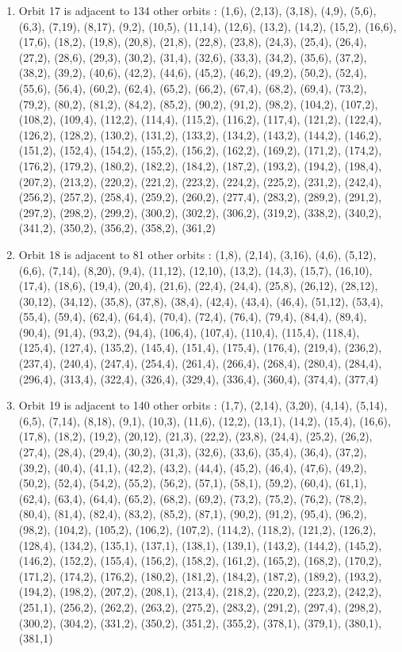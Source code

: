 \documentclass[12pt]{article}
\begin{document}
\begin{enumerate}
\item Orbit 17 is adjacent to 134 other orbits : (1,6), (2,13), (3,18), (4,9), (5,6), (6,3), (7,19), (8,17), (9,2), (10,5), (11,14), (12,6), (13,2), (14,2), (15,2), (16,6), (17,6), (18,2), (19,8), (20,8), (21,8), (22,8), (23,8), (24,3), (25,4), (26,4), (27,2), (28,6), (29,3), (30,2), (31,4), (32,6), (33,3), (34,2), (35,6), (37,2), (38,2), (39,2), (40,6), (42,2), (44,6), (45,2), (46,2), (49,2), (50,2), (52,4), (55,6), (56,4), (60,2), (62,4), (65,2), (66,2), (67,4), (68,2), (69,4), (73,2), (79,2), (80,2), (81,2), (84,2), (85,2), (90,2), (91,2), (98,2), (104,2), (107,2), (108,2), (109,4), (112,2), (114,4), (115,2), (116,2), (117,4), (121,2), (122,4), (126,2), (128,2), (130,2), (131,2), (133,2), (134,2), (143,2), (144,2), (146,2), (151,2), (152,4), (154,2), (155,2), (156,2), (162,2), (169,2), (171,2), (174,2), (176,2), (179,2), (180,2), (182,2), (184,2), (187,2), (193,2), (194,2), (198,4), (207,2), (213,2), (220,2), (221,2), (223,2), (224,2), (225,2), (231,2), (242,4), (256,2), (257,2), (258,4), (259,2), (260,2), (277,4), (283,2), (289,2), (291,2), (297,2), (298,2), (299,2), (300,2), (302,2), (306,2), (319,2), (338,2), (340,2), (341,2), (350,2), (356,2), (358,2), (361,2)
\item Orbit 18 is adjacent to 81 other orbits : (1,8), (2,14), (3,16), (4,6), (5,12), (6,6), (7,14), (8,20), (9,4), (11,12), (12,10), (13,2), (14,3), (15,7), (16,10), (17,4), (18,6), (19,4), (20,4), (21,6), (22,4), (24,4), (25,8), (26,12), (28,12), (30,12), (34,12), (35,8), (37,8), (38,4), (42,4), (43,4), (46,4), (51,12), (53,4), (55,4), (59,4), (62,4), (64,4), (70,4), (72,4), (76,4), (79,4), (84,4), (89,4), (90,4), (91,4), (93,2), (94,4), (106,4), (107,4), (110,4), (115,4), (118,4), (125,4), (127,4), (135,2), (145,4), (151,4), (175,4), (176,4), (219,4), (236,2), (237,4), (240,4), (247,4), (254,4), (261,4), (266,4), (268,4), (280,4), (284,4), (296,4), (313,4), (322,4), (326,4), (329,4), (336,4), (360,4), (374,4), (377,4)
\item Orbit 19 is adjacent to 140 other orbits : (1,7), (2,14), (3,20), (4,14), (5,14), (6,5), (7,14), (8,18), (9,1), (10,3), (11,6), (12,2), (13,1), (14,2), (15,4), (16,6), (17,8), (18,2), (19,2), (20,12), (21,3), (22,2), (23,8), (24,4), (25,2), (26,2), (27,4), (28,4), (29,4), (30,2), (31,3), (32,6), (33,6), (35,4), (36,4), (37,2), (39,2), (40,4), (41,1), (42,2), (43,2), (44,4), (45,2), (46,4), (47,6), (49,2), (50,2), (52,4), (54,2), (55,2), (56,2), (57,1), (58,1), (59,2), (60,4), (61,1), (62,4), (63,4), (64,4), (65,2), (68,2), (69,2), (73,2), (75,2), (76,2), (78,2), (80,4), (81,4), (82,4), (83,2), (85,2), (87,1), (90,2), (91,2), (95,4), (96,2), (98,2), (104,2), (105,2), (106,2), (107,2), (114,2), (118,2), (121,2), (126,2), (128,4), (134,2), (135,1), (137,1), (138,1), (139,1), (143,2), (144,2), (145,2), (146,2), (152,2), (155,4), (156,2), (158,2), (161,2), (165,2), (168,2), (170,2), (171,2), (174,2), (176,2), (180,2), (181,2), (184,2), (187,2), (189,2), (193,2), (194,2), (198,2), (207,2), (208,1), (213,4), (218,2), (220,2), (223,2), (242,2), (251,1), (256,2), (262,2), (263,2), (275,2), (283,2), (291,2), (297,4), (298,2), (300,2), (304,2), (331,2), (350,2), (351,2), (355,2), (378,1), (379,1), (380,1), (381,1)

\end{enumerate}
\end{document}
